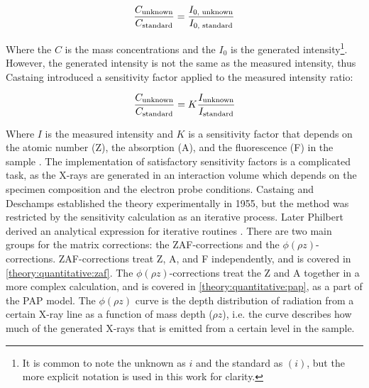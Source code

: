 \begin{equation}
    \label{eq:theory:quantitative:castaing_generated}
    \frac{C_\textnormal{unknown}}{C_\textnormal{standard}} = \frac{I_{0\textnormal{, unknown}}}{I_{0\textnormal{, standard}}}
\end{equation}

Where the $C$ is the mass concentrations and the $I_0$ is the generated intensity\footnote{It is common to note the unknown as $i$ and the standard as $(i)$, but the more explicit notation is used in this work for clarity.}.
However, the generated intensity is not the same as the measured intensity, thus Castaing introduced a sensitivity factor applied to the measured intensity ratio:


\begin{equation}
    \label{eq:theory:quantitative:castaing_measured}
    \frac{C_\textnormal{unknown}}{C_\textnormal{standard}} = K \frac{I_\textnormal{unknown}}{I_\textnormal{standard}}
\end{equation}

Where $I$ is the measured intensity and $K$ is a sensitivity factor that depends on the atomic number (Z), the absorption (A), and the fluorescence (F) in the sample \cite{goldstein_scanning_2018,williams_carter_tem_2009}.
The implementation of satisfactory sensitivity factors is a complicated task, as the X-rays are generated in an interaction volume which depends on the specimen composition and the electron probe conditions.
Castaing and Deschamps established the theory experimentally in 1955, but the method was restricted by the sensitivity calculation as an iterative process. %
Later Philbert derived an analytical expression for iterative routines \cite{philbert_1963}.
There are two main groups for the matrix corrections: the ZAF-corrections and the $\phi(\rho z)$-corrections.
ZAF-corrections treat Z, A, and F independently, and is covered in \cref{theory:quantitative:zaf}.
The $\phi(\rho z)$-corrections treat the Z and A together in a more complex calculation, and is covered in \cref{theory:quantitative:pap}, as a part of the PAP model.
The $\phi(\rho z)$ curve is the depth distribution of radiation from a certain X-ray line as a function of mass depth ($\rho z$), i.e. the curve describes how much of the generated X-rays that is emitted from a certain level in the sample.


